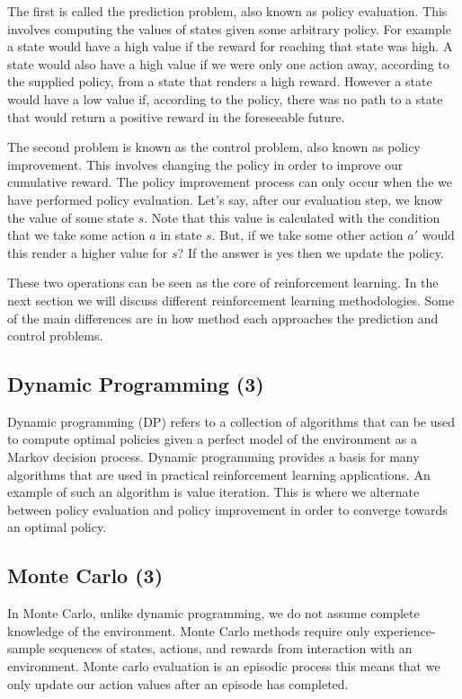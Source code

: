 The first is called the prediction problem, also known as policy evaluation.
This involves computing the values of states given some arbitrary policy\citep{sutton1998reinforcement}.
For example a state would have a high value if the reward for reaching that state was high.
A state would also have a high value if we were only one action away, according to the supplied policy,
from a state that renders a high reward.
However a state would have a low value if, according to the policy, there was no path to a state that
would return a positive reward in the foreseeable future.

The second problem is known as the control problem, also known as policy improvement.
This involves changing the policy in order to improve our cumulative reward.
The policy improvement process can only occur when the we have performed policy evaluation.
Let's say, after our evaluation step, we know the value of some state $s$.
Note that this value is calculated with the condition that we take some action $a$ in state $s$.
But, if we take some other action $a'$ would this render a higher value for $s$?
If the answer is yes then we update the policy.

These two operations can be seen as the core of reinforcement learning.
In the next section we will discuss different reinforcement learning methodologies.
Some of the main differences are in how method each approaches the prediction and control problems.

\subsection{Dynamic Programming (3)}\label{subsec:dp}
Dynamic programming (DP) refers to a collection of algorithms that can be used to compute optimal policies given a
perfect model of the environment as a Markov decision process\citep{sutton1998reinforcement}.
Dynamic programming provides a basis for many algorithms that are used in practical reinforcement learning applications.
An example of such an algorithm is value iteration.
This is where we alternate between policy evaluation and policy improvement in order to converge towards an optimal
policy.

\subsection{Monte Carlo (3)}\label{subsec:mc}
In Monte Carlo, unlike dynamic programming, we do not assume complete knowledge of the environment.
Monte Carlo methods require only experience-sample sequences of states, actions, and rewards from interaction with
an environment\citep{sutton1998reinforcement}.
Monte carlo evaluation is an episodic process this means that we only update our action values after an episode
has completed.


